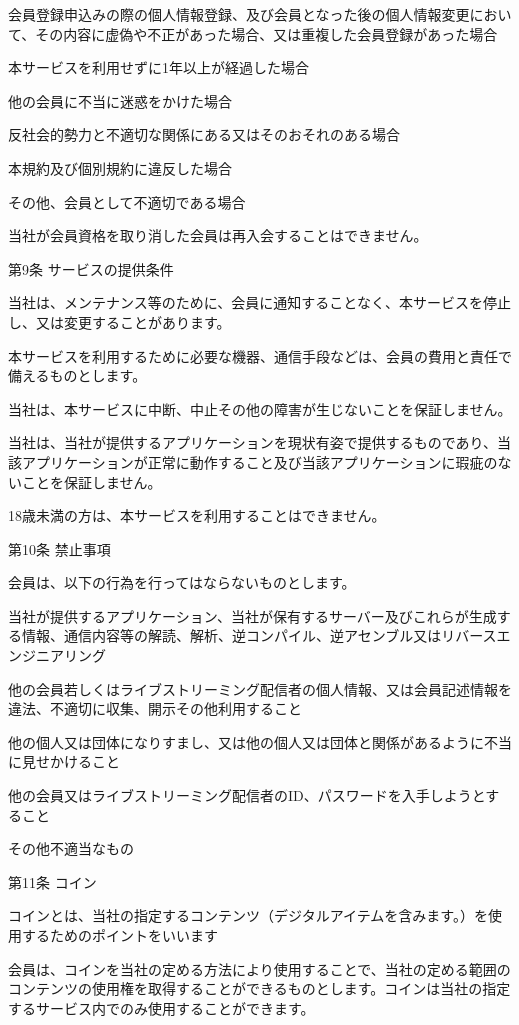         会員登録申込みの際の個人情報登録、及び会員となった後の個人情報変更において、その内容に虚偽や不正があった場合、又は重複した会員登録があった場合

        本サービスを利用せずに1年以上が経過した場合

        他の会員に不当に迷惑をかけた場合

        反社会的勢力と不適切な関係にある又はそのおそれのある場合

        本規約及び個別規約に違反した場合

        その他、会員として不適切である場合

    当社が会員資格を取り消した会員は再入会することはできません。

第9条 サービスの提供条件

    当社は、メンテナンス等のために、会員に通知することなく、本サービスを停止し、又は変更することがあります。

    本サービスを利用するために必要な機器、通信手段などは、会員の費用と責任で備えるものとします。

    当社は、本サービスに中断、中止その他の障害が生じないことを保証しません。

    当社は、当社が提供するアプリケーションを現状有姿で提供するものであり、当該アプリケーションが正常に動作すること及び当該アプリケーションに瑕疵のないことを保証しません。

    18歳未満の方は、本サービスを利用することはできません。

第10条 禁止事項

会員は、以下の行為を行ってはならないものとします。

    当社が提供するアプリケーション、当社が保有するサーバー及びこれらが生成する情報、通信内容等の解読、解析、逆コンパイル、逆アセンブル又はリバースエンジニアリング

    他の会員若しくはライブストリーミング配信者の個人情報、又は会員記述情報を違法、不適切に収集、開示その他利用すること

    他の個人又は団体になりすまし、又は他の個人又は団体と関係があるように不当に見せかけること

    他の会員又はライブストリーミング配信者のID、パスワードを入手しようとすること

    その他不適当なもの

第11条 コイン

    コインとは、当社の指定するコンテンツ（デジタルアイテムを含みます。）を使用するためのポイントをいいます

    会員は、コインを当社の定める方法により使用することで、当社の定める範囲のコンテンツの使用権を取得することができるものとします。コインは当社の指定するサービス内でのみ使用することができます。

